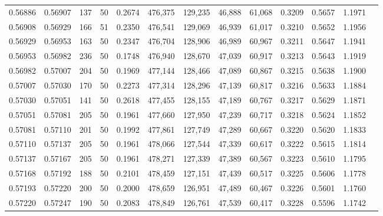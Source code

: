 \begin{tabular}{rrrrrrrrrrrrr}
0.56886 & 0.56907 &   137 &  50 &                                     0.2674 & 476,375 & 129,235 &  46,888 &  61,068 & 0.3209 & 0.5657 & 1.1971 \\
0.56908 & 0.56929 &   166 &  51 &                                     0.2350 & 476,541 & 129,069 &  46,939 &  61,017 & 0.3210 & 0.5652 & 1.1956 \\
0.56929 & 0.56953 &   163 &  50 &                                     0.2347 & 476,704 & 128,906 &  46,989 &  60,967 & 0.3211 & 0.5647 & 1.1941 \\
0.56953 & 0.56982 &   236 &  50 &                                     0.1748 & 476,940 & 128,670 &  47,039 &  60,917 & 0.3213 & 0.5643 & 1.1919 \\
0.56982 & 0.57007 &   204 &  50 &                                     0.1969 & 477,144 & 128,466 &  47,089 &  60,867 & 0.3215 & 0.5638 & 1.1900 \\
0.57007 & 0.57030 &   170 &  50 &                                     0.2273 & 477,314 & 128,296 &  47,139 &  60,817 & 0.3216 & 0.5633 & 1.1884 \\
0.57030 & 0.57051 &   141 &  50 &                                     0.2618 & 477,455 & 128,155 &  47,189 &  60,767 & 0.3217 & 0.5629 & 1.1871 \\
0.57051 & 0.57081 &   205 &  50 &                                     0.1961 & 477,660 & 127,950 &  47,239 &  60,717 & 0.3218 & 0.5624 & 1.1852 \\
0.57081 & 0.57110 &   201 &  50 &                                     0.1992 & 477,861 & 127,749 &  47,289 &  60,667 & 0.3220 & 0.5620 & 1.1833 \\
0.57110 & 0.57137 &   205 &  50 &                                     0.1961 & 478,066 & 127,544 &  47,339 &  60,617 & 0.3222 & 0.5615 & 1.1814 \\
0.57137 & 0.57167 &   205 &  50 &                                     0.1961 & 478,271 & 127,339 &  47,389 &  60,567 & 0.3223 & 0.5610 & 1.1795 \\
0.57168 & 0.57192 &   188 &  50 &                                     0.2101 & 478,459 & 127,151 &  47,439 &  60,517 & 0.3225 & 0.5606 & 1.1778 \\
0.57193 & 0.57220 &   200 &  50 &                                     0.2000 & 478,659 & 126,951 &  47,489 &  60,467 & 0.3226 & 0.5601 & 1.1760 \\
0.57220 & 0.57247 &   190 &  50 &                                     0.2083 & 478,849 & 126,761 &  47,539 &  60,417 & 0.3228 & 0.5596 & 1.1742 \\

\end{tabular}
